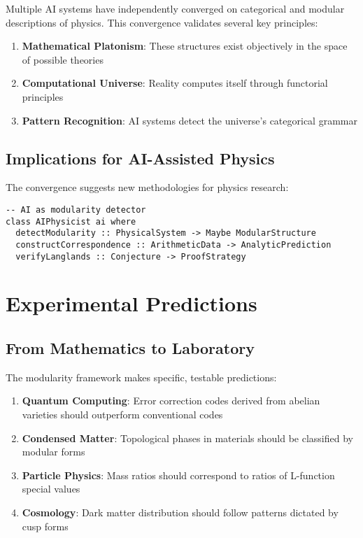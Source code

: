 \documentclass[12pt,a4paper]{article}
\begin{document}
Multiple AI systems have independently converged on categorical and modular descriptions of physics. This convergence validates several key principles:

\begin{enumerate}
\item \textbf{Mathematical Platonism}: These structures exist objectively in the space of possible theories
\item \textbf{Computational Universe}: Reality computes itself through functorial principles
\item \textbf{Pattern Recognition}: AI systems detect the universe's categorical grammar
\end{enumerate}

\subsection{Implications for AI-Assisted Physics}

The convergence suggests new methodologies for physics research:

\begin{lstlisting}[style=haskell]
-- AI as modularity detector
class AIPhysicist ai where
  detectModularity :: PhysicalSystem -> Maybe ModularStructure
  constructCorrespondence :: ArithmeticData -> AnalyticPrediction
  verifyLanglands :: Conjecture -> ProofStrategy
\end{lstlisting}

\section{Experimental Predictions}

\subsection{From Mathematics to Laboratory}

The modularity framework makes specific, testable predictions:

\begin{enumerate}
\item \textbf{Quantum Computing}: Error correction codes derived from abelian varieties should outperform conventional codes
\item \textbf{Condensed Matter}: Topological phases in materials should be classified by modular forms
\item \textbf{Particle Physics}: Mass ratios should correspond to ratios of L-function special values
\item \textbf{Cosmology}: Dark matter distribution should follow patterns dictated by cusp forms
\end{enumerate}
\end{document}
